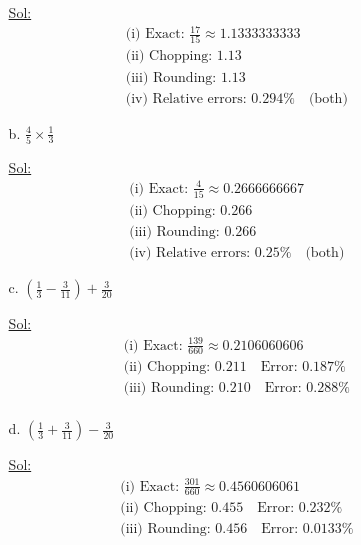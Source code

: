 \begin{enumerate}
\begin{itemize}
      \underline{Sol:}\\
      \[
        \begin{array}{l}
          \textrm{(i) Exact: } \frac{17}{15} \approx 1.1333333333 \\
          \textrm{(ii) Chopping: } 1.13 \\
          \textrm{(iii) Rounding: } 1.13 \\
          \textrm{(iv) Relative errors: } 0.294\% \quad \textrm{(both)}
        \end{array}
      \]
      \bigbreak

    \item[b.] \( \frac{4}{5} \times \frac{1}{3} \)

      \underline{Sol:}\\
      \[
        \begin{array}{l}
          \textrm{(i) Exact: } \frac{4}{15} \approx 0.2666666667 \\
          \textrm{(ii) Chopping: } 0.266 \\
          \textrm{(iii) Rounding: } 0.266 \\
          \textrm{(iv) Relative errors: } 0.25\% \quad \textrm{(both)}
        \end{array}
      \]
      \bigbreak

    \item[c.] \( \left( \frac{1}{3} - \frac{3}{11} \right) + \frac{3}{20} \)

      \underline{Sol:}\\
      \[
        \begin{array}{l}
          \textrm{(i) Exact: } \frac{139}{660} \approx 0.2106060606 \\
          \textrm{(ii) Chopping: } 0.211 \quad \textrm{Error: } 0.187\% \\
          \textrm{(iii) Rounding: } 0.210 \quad \textrm{Error: } 0.288\% \\
        \end{array}
      \]
      \bigbreak

    \item[d.] \( \left( \frac{1}{3} + \frac{3}{11} \right) - \frac{3}{20} \)

      \underline{Sol:}\\
      \[
        \begin{array}{l}
          \textrm{(i) Exact: } \frac{301}{660} \approx 0.4560606061 \\
          \textrm{(ii) Chopping: } 0.455 \quad \textrm{Error: } 0.232\% \\
          \textrm{(iii) Rounding: } 0.456 \quad \textrm{Error: } 0.0133\% \\
        \end{array}
      \]
      \bigbreak
  \end{itemize}


\end{enumerate}
